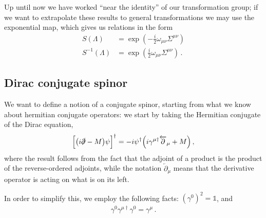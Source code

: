 \documentclass[main.tex]{subfiles}
\begin{document}
Up until now we have worked ``near the identity'' of our transformation group; if we want to extrapolate these results to general transformations we may use the exponential map, which gives us relations in the form 
%
\begin{align}
S(\Lambda ) &= \exp( -\frac{i}{2} \omega_{\mu \nu } \Sigma^{\mu \nu })  \\
S^{-1} (\Lambda ) &= \exp(\frac{i}{2} \omega_{\mu \nu } \Sigma^{\mu \nu })
\,.
\end{align}
%

\subsection{Dirac conjugate spinor}

We want to define a notion of a conjugate spinor, starting from what we know about hermitian conjugate operators: we start by taking the Hermitian conjugate of the Dirac equation, 
%
\begin{align}
\qty[\qty(i \slashed{\partial} -M) \psi ]^\dag = - i \psi ^\dag \qty(i \gamma^{\mu \dag} \overleftarrow{\partial}_{\mu } + M )
\,,
\end{align}
%
where the result follows from the fact that the adjoint of a product is the product of the reverse-ordered adjoints, while the notation \(\overleftarrow{\partial}_{\mu }\) means that the derivative operator is acting on what is on its left. 

In order to simplify this, we employ the following facts: \((\gamma^{0})^2 = \mathbb{1}\), and 
%
\begin{align}
\gamma^{0} \gamma^{\mu \dag} \gamma^{0} = \gamma^{\mu }
\,.
\end{align}
\end{document}
